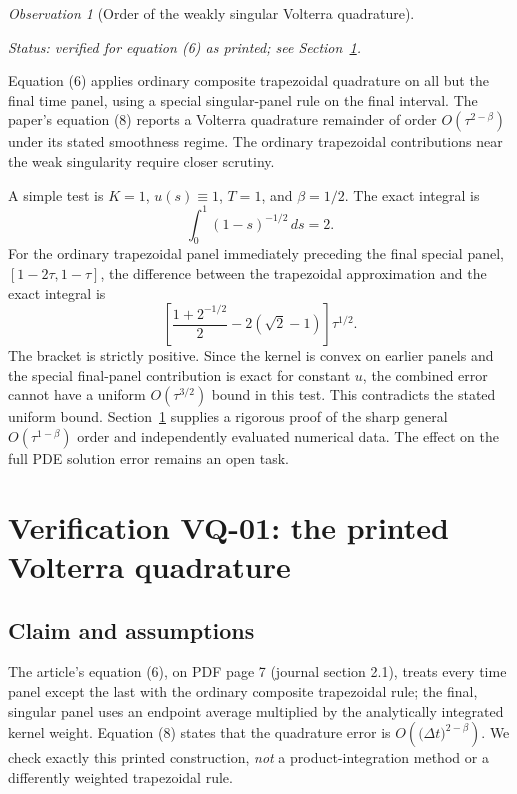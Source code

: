 \documentclass[11pt,a4paper]{amsart}
\theoremstyle{remark}
\newtheorem{observation}{Observation}
\theoremstyle{plain}
\theoremstyle{remark}
\newcommand{\auditstatus}[1]{\par\noindent\emph{#1.}\enspace}
\numberwithin{equation}{section}
\begin{document}
\begin{observation}[Order of the weakly singular Volterra quadrature]
\label{obs:volterra-order}
\auditstatus{Status: verified for equation (6) as printed; see Section~\ref{sec:verified-vq}}

Equation (6) applies ordinary composite trapezoidal quadrature on all but the final time panel, using a special singular-panel rule on the final interval. The paper's equation (8) reports a Volterra quadrature remainder of order $O(\tau^{2-\beta})$ under its stated smoothness regime. The ordinary trapezoidal contributions near the weak singularity require closer scrutiny.

A simple test is $K=1$, $u(s)\equiv1$, $T=1$, and $\beta=1/2$. The exact integral is
\[
\int_0^1(1-s)^{-1/2}\,ds=2.
\]
For the ordinary trapezoidal panel immediately preceding the final special panel, $[1-2\tau,1-\tau]$, the difference between the trapezoidal approximation and the exact integral is
\[
\left[\frac{1+2^{-1/2}}{2}-2(\sqrt 2-1)\right]\tau^{1/2}.
\]
The bracket is strictly positive. Since the kernel is convex on earlier panels and the special final-panel contribution is exact for constant $u$, the combined error cannot have a uniform $O(\tau^{3/2})$ bound in this test. This contradicts the stated uniform bound. Section~\ref{sec:verified-vq} supplies a rigorous proof of the sharp general $O(\tau^{1-\beta})$ order and independently evaluated numerical data. The effect on the full PDE solution error remains an open task.
\end{observation}


\section{Verification VQ-01: the printed Volterra quadrature}
\label{sec:verified-vq}

\subsection{Claim and assumptions}
The article's equation (6), on PDF page 7 (journal section 2.1), treats every time panel except the last with the ordinary composite trapezoidal rule; the final, singular panel uses an endpoint average multiplied by the analytically integrated kernel weight. Equation (8) states that the quadrature error is $O(\bigl(\Delta t\bigr)^{2-\beta})$. We check exactly this printed construction, \emph{not} a product-integration method or a differently weighted trapezoidal rule.
\end{document}
